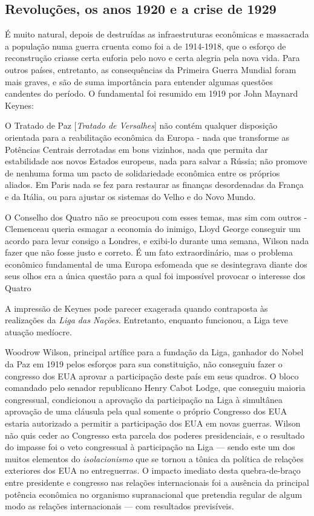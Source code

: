 \subsection{Revoluções, os anos 1920 e a crise de 1929}

É muito natural, depois de destruídas as infraestruturas econômicas e massacrada a população numa guerra cruenta como foi a de 1914-1918, que o esforço de reconstrução criasse certa euforia pelo novo e certa alegria pela nova vida. Para outros países, entretanto, as consequências da Primeira Guerra Mundial foram mais graves, e são de suma importância para entender algumas questões candentes do período. O fundamental foi resumido em 1919 por John Maynard Keynes:

\begin{citacao}
O Tratado de Paz [\textit{Tratado de Versalhes}] não contém qualquer disposição orientada para a reabilitação econômica da Europa - nada que transforme as Potências Centrais derrotadas em bons vizinhos, nada que permita dar estabilidade aos novos Estados europeus, nada para salvar a Rússia; não promove de nenhuma forma um pacto de solidariedade econômica entre os próprios aliados. Em Paris nada se fez para restaurar as finanças desordenadas da França e da Itália, ou para ajustar os sistemas do Velho e do Novo Mundo.

O Conselho dos Quatro não se preocupou com esses temas, mas sim com outros - Clemenceau queria esmagar a economia do inimigo, Lloyd George conseguir um acordo para levar consigo a Londres, e exibi-lo durante uma semana, Wilson nada fazer que não fosse justo e correto. É um fato extraordinário, mas o problema econômico fundamental de uma Europa esfomeada que se desintegrava diante dos seus olhos era a única questão para a qual foi impossível provocar o interesse dos Quatro \cite[p.~157]{keynes_paz_2002}
\end{citacao}

A impressão de Keynes pode parecer exagerada quando contraposta às realizações da \textit{Liga das Nações}. Entretanto, enquanto funcionou, a Liga teve atuação medíocre. 

Woodrow Wilson, principal artífice para a fundação da Liga, ganhador do Nobel da Paz em 1919 pelos esforços para sua constituição, não conseguiu fazer o congresso dos EUA aprovar a participação deste país em seus quadros. O bloco comandado pelo senador republicano Henry Cabot Lodge, que conseguiu maioria congressual, condicionou a aprovação da participação na Liga à simultânea aprovação de uma cláusula pela qual somente o próprio Congresso dos EUA estaria autorizado a permitir a participação dos EUA em novas guerras. Wilson não quis ceder ao Congresso esta parcela dos poderes presidenciais, e o resultado do impasse foi o veto congressual à participação na Liga \cite{hewes_lodge_1970} --- sendo este um dos muitos elementos do \textit{isolacionismo} que se tornou a tônica da política de relações exteriores dos EUA no entreguerras. O impacto imediato desta quebra-de-braço entre presidente e congresso nas relações internacionais foi a ausência da principal potência econômica no organismo supranacional que pretendia regular de algum modo as relações internacionais --- com resultados previsíveis.

